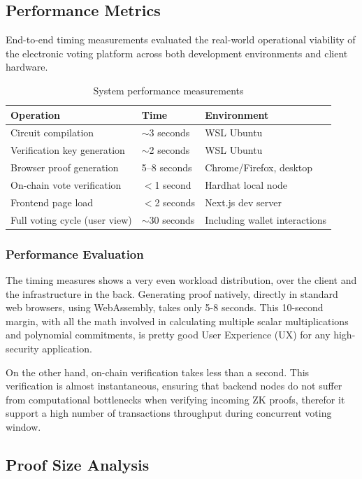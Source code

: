 \documentclass[12pt, a4paper]{report}
\begin{document}
\subsection{Performance Metrics}

End-to-end timing measurements evaluated the real-world operational viability of the electronic voting platform across both development environments and client hardware.

\begin{table}[H]
\centering
\caption{System performance measurements}
\label{tab:performance}
\begin{tabular}{|l|l|l|}
\hline
\textbf{Operation} & \textbf{Time} & \textbf{Environment} \\ \hline
Circuit compilation & $\sim$3 seconds & WSL Ubuntu \\ \hline
Verification key generation & $\sim$2 seconds & WSL Ubuntu \\ \hline
Browser proof generation & 5--8 seconds & Chrome/Firefox, desktop \\ \hline
On-chain vote verification & $<$1 second & Hardhat local node \\ \hline
Frontend page load & $<$2 seconds & Next.js dev server \\ \hline
Full voting cycle (user view) & $\sim$30 seconds & Including wallet interactions \\ \hline
\end{tabular}
\end{table}

\subsubsection*{Performance Evaluation}
The timing measures shows a very even workload distribution, over the client and the infrastructure in the back. Generating proof natively, directly in standard web browsers, using WebAssembly, takes only 5-8 seconds. This 10-second margin, with all the math involved in calculating multiple scalar multiplications and polynomial commitments, is pretty good User Experience (UX) for any high-security application.

On the other hand, on-chain verification takes less than a second. This verification is almost instantaneous, ensuring that backend nodes do not suffer from computational bottlenecks when verifying incoming ZK proofs, therefor it support a high number of transactions throughput during concurrent voting window.

\subsection{Proof Size Analysis}
\end{document}
